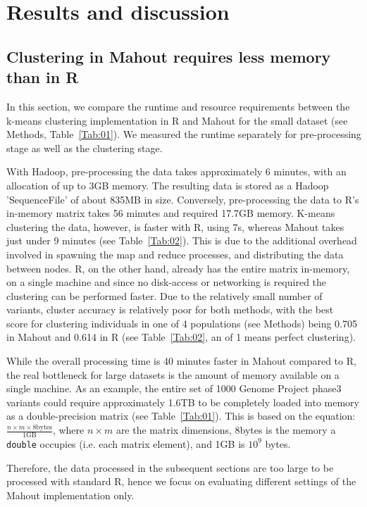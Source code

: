 \documentclass{bioinfo}
\begin{document}
\section*{Results and discussion}

\subsection*{Clustering in Mahout requires less memory than in R}
In this section, we compare the runtime and resource requirements between the k-means clustering implementation in R and Mahout for the small \NinteenPhaseone{} dataset (see Methods, Table~\ref{Tab:01}). 
We measured the runtime separately for pre-processing stage as well as the clustering stage. 

With Hadoop, pre-processing the data takes approximately 6 minutes, with an allocation of up to 3GB memory. 
The resulting data is stored as a Hadoop 'SequenceFile' of about 835MB in size.
Conversely,  pre-processing the data to R's in-memory matrix takes 56 minutes and required 17.7GB memory. 
K-means clustering the data, however, is faster with R, using 7s, whereas Mahout takes just under 9 minutes (see Table~\ref{Tab:02}). 
This is due to the additional overhead involved in spawning the map and reduce processes, and distributing the data between nodes.
R, on the other hand, already has the entire matrix in-memory, on a single machine and since no disk-access or networking is required the clustering can be performed faster. 
Due to the relatively small number of variants, cluster accuracy is relatively poor for both methods, with the best \ARI{}~\citep{Hubert1985} score for clustering individuals in one of 4 populations (see Methods) being 0.705 in Mahout and 0.614 in R (see Table~\ref{Tab:02}, an \ARI{} of 1 means perfect clustering).

While the overall processing time is 40 minutes faster in Mahout compared to R, the real bottleneck for large datasets is the amount of memory available on a single machine. 
As an example, the entire set of 1000 Genome Project phase3 variants could require approximately 1.6TB to be completely loaded into memory as a double-precision matrix (see Table~\ref{Tab:01}). This is based on the equation:
$\frac{n \times m \times 8\text{bytes}}{1\text{GB}}$, where $n \times m$ are the matrix dimensions, 8bytes is the memory a \texttt{double} occupies (i.e. each matrix element), and  1GB is $10^9$ bytes.

Therefore, the data processed in the subsequent sections are too large to be processed with standard R, hence we focus on evaluating different settings of the Mahout implementation only.  
\end{document}
